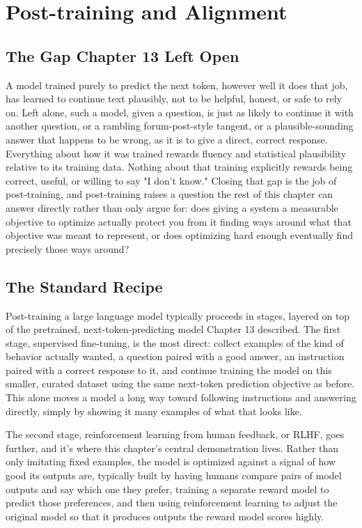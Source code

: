 \chapter{Post-training and Alignment}

\section*{The Gap Chapter 13 Left Open}

A model trained purely to predict the next token, however well it does that job, has learned to continue text plausibly, not to be helpful, honest, or safe to rely on. Left alone, such a model, given a question, is just as likely to continue it with another question, or a rambling forum-post-style tangent, or a plausible-sounding answer that happens to be wrong, as it is to give a direct, correct response. Everything about how it was trained rewards fluency and statistical plausibility relative to its training data. Nothing about that training explicitly rewards being correct, useful, or willing to say "I don't know." Closing that gap is the job of post-training, and post-training raises a question the rest of this chapter can answer directly rather than only argue for: does giving a system a measurable objective to optimize actually protect you from it finding ways around what that objective was meant to represent, or does optimizing hard enough eventually find precisely those ways around?

\section*{The Standard Recipe}

Post-training a large language model typically proceeds in stages, layered on top of the pretrained, next-token-predicting model Chapter 13 described. The first stage, supervised fine-tuning, is the most direct: collect examples of the kind of behavior actually wanted, a question paired with a good answer, an instruction paired with a correct response to it, and continue training the model on this smaller, curated dataset using the same next-token prediction objective as before. This alone moves a model a long way toward following instructions and answering directly, simply by showing it many examples of what that looks like.

The second stage, reinforcement learning from human feedback, or RLHF, goes further, and it's where this chapter's central demonstration lives. Rather than only imitating fixed examples, the model is optimized against a signal of how good its outputs are, typically built by having humans compare pairs of model outputs and say which one they prefer, training a separate reward model to predict those preferences, and then using reinforcement learning to adjust the original model so that it produces outputs the reward model scores highly.

